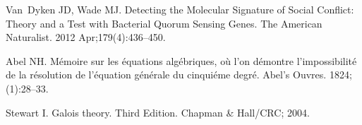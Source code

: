 \documentclass[aps,pre,amsfonts,floatfix, onecolumn,showkeys]{revtex4-1}
\begin{document}
\begin{thebibliography}{10}
Van~Dyken JD, Wade MJ.
\newblock Detecting the Molecular Signature of Social Conflict: Theory and a
  Test with Bacterial Quorum Sensing Genes.
\newblock The American Naturalist. 2012 Apr;179(4):436--450.

Abel NH.
\newblock M\'emoire sur les \'equations alg\'ebriques, o\`u l'on d\'emontre
  l'impossibilit\'e de la r\'esolution de l'\'equation g\'en\'erale du
  cinqui\'eme degr\'e.
\newblock Abel's Ouvres. 1824;(1):28--33.

Stewart I.
\newblock Galois theory. Third Edition.
\newblock Chapman \& Hall/CRC; 2004.

\end{thebibliography}
\end{document}
